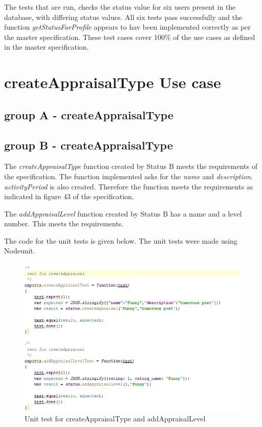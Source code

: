 \documentclass[a4paper,12pt]{article}
\begin{document}
The tests that are run, checks the status value for six users present in the database, with differing status values. All six tests pass successfully and the function \textit{getStatusForProfile} appears to hav been implemented correctly as per the master specification. These test cases cover 100\% of the use cases as defined in the master specification.

\newpage
\section{createAppraisalType Use case}
\subsection{group A - createAppraisalType}

\subsection{group B - createAppraisalType}

The \textit{createAppraisalType} function created by Status B meets the requirements of the specification. The function implemented asks for the \textit{name} and \textit{description}. \textit{activityPeriod} is also created. Therefore the function meets the requirements as indicated in figure 43 of the specification.

The \textit{addAppraisalLevel} function created by Status B has a name and a level number. This meets the requirements.

The code for the unit tests is given below. The unit tests were made using Nodeunit.

\begin{figure}[H]
		\centering
		\includegraphics[width=1.0\textwidth]{Figures/createAppraisalTypeUnitTests.png}
		\caption{Unit test for createAppraisalType and addAppraisalLevel}
	\end{figure}
\end{document}
